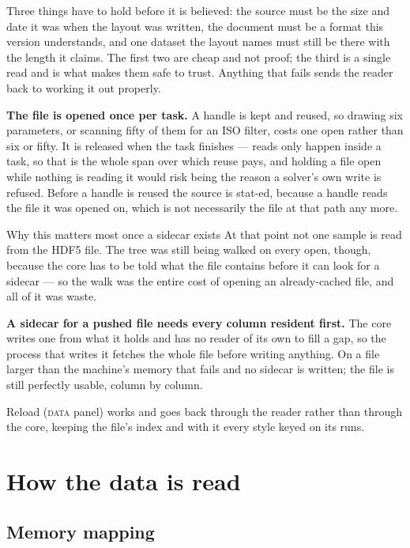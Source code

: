 \documentclass[11pt,a4paper,oneside]{report}
\begin{document}
Three things have to hold before it is believed: the source must be the size
and date it was when the layout was written, the document must be a format this
version understands, and one dataset the layout names must still be there with
the length it claims. The first two are cheap and not proof; the third is a
single read and is what makes them safe to trust. Anything that fails sends the
reader back to working it out properly.

\textbf{The file is opened once per task.} A handle is kept and reused, so
drawing six parameters, or scanning fifty of them for an ISO filter, costs one
open rather than six or fifty. It is released when the task finishes --- reads
only happen inside a task, so that is the whole span over which reuse pays, and
holding a file open while nothing is reading it would risk being the reason a
solver's own write is refused. Before a handle is reused the source is stat-ed,
because a handle reads the file it was opened on, which is not necessarily the
file at that path any more.

\begin{aoenote}{Why this matters most once a sidecar exists}
At that point not one sample is read from the HDF5 file. The tree was still
being walked on every open, though, because the core has to be told what the
file contains before it can look for a sidecar --- so the walk was the entire
cost of opening an already-cached file, and all of it was waste.
\end{aoenote}

\begin{aoelimit}
\textbf{A sidecar for a pushed file needs every column resident first.} The
core writes one from what it holds and has no reader of its own to fill a gap,
so the process that writes it fetches the whole file before writing anything.
On a file larger than the machine's memory that fails and no sidecar is
written; the file is still perfectly usable, column by column.
\end{aoelimit}

Reload (\textsc{data} panel) works and goes back through the reader rather than
through the core, keeping the file's index and with it every style keyed on its
runs.

\chapter{How the data is read}
\label{ch:reading}

\section{Memory mapping}
\end{document}
